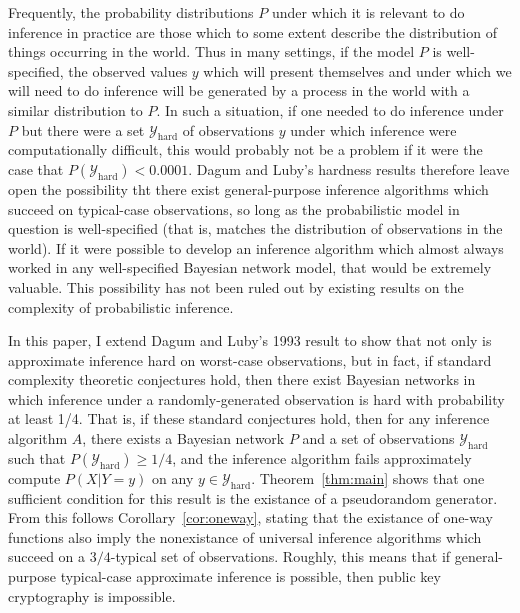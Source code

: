 \documentclass{article}
\theoremstyle{definition}
\theoremstyle{remark}
\begin{document}
Frequently, the probability distributions $P$ under which it is relevant to do inference in practice are those which to some extent describe the distribution of things occurring in the world.
Thus in many settings, if the model $P$ is well-specified, the observed values $y$ which will present themselves and under which we will need to do inference will be generated by a process in the world with a similar distribution to $P$.
In such a situation, if one needed to do inference under $P$ but there were a set $\mathcal{Y}_\text{hard}$ of observations $y$ under which inference were computationally difficult, this would probably not be a problem if it were the case that $P(\mathcal{Y}_\text{hard}) < 0.0001$.
Dagum and Luby's hardness results therefore leave open the possibility tht there exist general-purpose inference algorithms which succeed on typical-case observations, so long as the probabilistic model in question is well-specified (that is, matches the distribution of observations in the world).
If it were possible to develop an inference algorithm which almost always worked in any well-specified Bayesian network model, that would be extremely valuable.
This possibility has not been ruled out by existing results on the complexity of probabilistic inference.

In this paper, I extend Dagum and Luby's 1993 result \cite{dagum1993} to show that not only is approximate inference hard on worst-case observations, but in fact, if standard complexity theoretic conjectures hold, then there exist Bayesian networks in which inference under a randomly-generated observation is hard with probability at least 1/4.
That is, if these standard conjectures hold, then for any inference algorithm $A$, there exists a Bayesian network $P$ and a set of observations $\mathcal{Y}_\text{hard}$ such that $P(\mathcal{Y}_\text{hard}) \geq 1/4$, and the inference algorithm fails approximately compute $P(X | Y = y)$ on any $y \in \mathcal{Y}_\text{hard}$.
Theorem~\ref{thm:main} shows that one sufficient condition for this result is the existance of a pseudorandom generator.
From this follows Corollary~\ref{cor:oneway}, stating that the existance of one-way functions also imply the nonexistance of universal inference algorithms which succeed on a $3/4$-typical set of observations.
Roughly, this means that if general-purpose typical-case approximate inference is possible, then public key cryptography is impossible.
\end{document}
